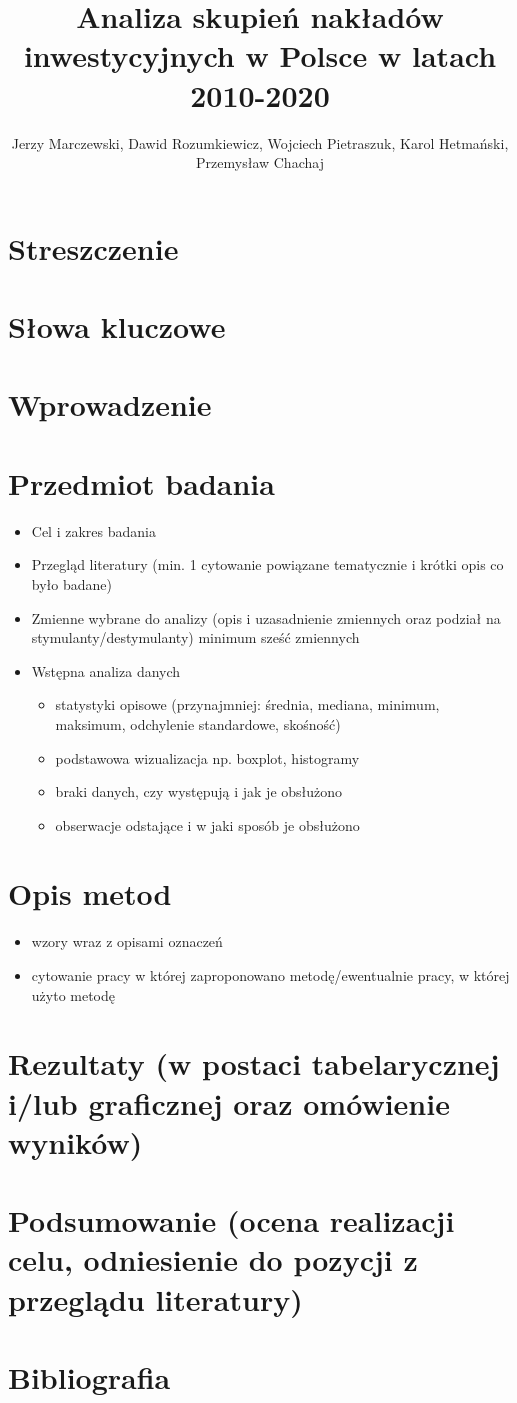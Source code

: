 \documentclass{article}
\title{Analiza skupień nakładów inwestycyjnych w Polsce w latach 2010-2020}
\author{Jerzy Marczewski, Dawid Rozumkiewicz, Wojciech Pietraszuk, Karol Hetmański, Przemysław Chachaj}
\date{}
\begin{document}
\maketitle

\section{Streszczenie}

\section{Słowa kluczowe}

\section{Wprowadzenie}

\section{Przedmiot badania}
    \begin{itemize}
        \item Cel i zakres badania
        \item Przegląd literatury (min. 1 cytowanie powiązane tematycznie i krótki opis co było badane)
        \item Zmienne wybrane do analizy (opis i uzasadnienie zmiennych oraz podział na stymulanty/destymulanty) minimum sześć zmiennych
        \item Wstępna analiza danych
        \begin{itemize}
            \item statystyki opisowe (przynajmniej: średnia, mediana, minimum, maksimum, odchylenie standardowe, skośność)
            \item podstawowa wizualizacja np. boxplot, histogramy
            \item braki danych, czy występują i jak je obsłużono
            \item obserwacje odstające i w jaki sposób je obsłużono
        \end{itemize}
    \end{itemize}

\section{Opis metod}
    \begin{itemize}
        \item wzory wraz z opisami oznaczeń
        \item cytowanie pracy w której zaproponowano metodę/ewentualnie pracy, w której użyto metodę
    \end{itemize}

\section{Rezultaty (w postaci tabelarycznej i/lub graficznej oraz omówienie wyników)}
\section{Podsumowanie (ocena realizacji celu, odniesienie do pozycji z przeglądu literatury)}
\section{Bibliografia}
\end{document}
